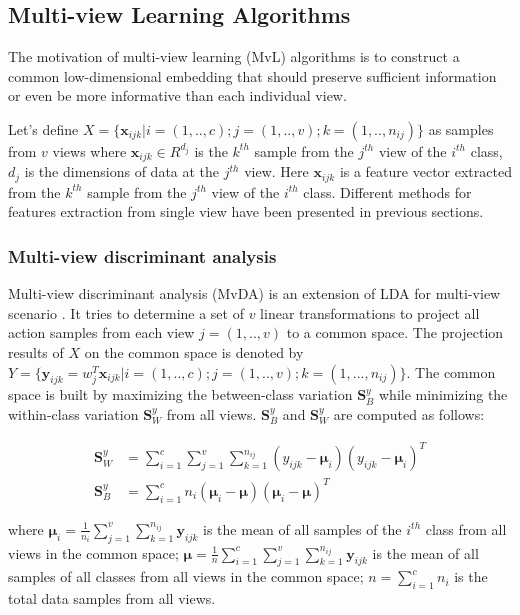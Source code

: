 
\subsection{Multi-view Learning Algorithms}

    The motivation of multi-view learning (MvL) algorithms is to construct a common low-dimensional embedding that should preserve sufficient information or even be more informative than each individual view.

    Let's define $X = \{\boldsymbol{x}_{ijk}|i=(1,..,c);j = (1,..,v);k=(1,..,n_{ij})\}$ as samples from $v$ views where $\boldsymbol{x}_{ijk} \in R^{d_j}$ is the $k^{th}$ sample from the $j^{th}$ view of the $i^{th}$ class, $d_j$ is the dimensions of data at the $j^{th}$ view.
    Here ${\boldsymbol x}_{ijk}$ is a feature vector extracted from the $k^{th}$ sample from the $j^{th}$ view of the $i^{th}$ class.
    Different methods for features extraction from single view have been presented in previous sections. 

    \subsubsection{Multi-view discriminant analysis}
        Multi-view discriminant analysis (MvDA) is an extension of LDA for multi-view scenario \cite{kan2015multi}.
        It tries to determine a set of $v$ linear transformations to project all action samples from each view $j = (1,..,v)$ to a common space.
        The projection results of $X$ on the common space is denoted by $Y = \{\boldsymbol{y}_{ijk} = w_j^T\boldsymbol{x}_{ijk}|i=(1,..,c); j=(1,..,v); k=(1,...,n_{ij})\}$.
        The common space is built by maximizing the between-class variation $\boldsymbol{S}_B^y$ while minimizing the within-class variation $\boldsymbol{S}_W^y$ from all views. $\boldsymbol{S}_B^y$ and $\boldsymbol{S}_W^y$ are computed as follows: 

        \begin{align}
            \boldsymbol{S}_W^y &= \sum_{i=1}^{c}\sum_{j=1}^{v}\sum_{k=1}^{n_{ij}}(y_{ijk}-\boldsymbol{\mu}_i)(y_{ijk}-\boldsymbol{\mu}_i)^T \label{eq:MvDA_Sw}\\
            \boldsymbol{S}_B^y &= \sum_{i=1}^{c}n_i(\boldsymbol{\mu}_i - \boldsymbol{\mu})(\boldsymbol{\mu}_i - \boldsymbol{\mu})^T \label{eq:MvDA_Sb}
        \end{align}

        where $\boldsymbol{\mu}_i=\frac{1}{n_i}\sum_{j=1}^{v}{\sum_{k=1}^{n_{ij}}}{\boldsymbol{y}_{ijk}}$ is the mean of all samples of the $i^{th}$ class from all views in the common space; $\boldsymbol{\mu}=\frac{1}{n}\sum_{i=1}^{c}\sum_{j=1}^{v}{\sum_{k=1}^{n_{ij}}{\boldsymbol{y}_{ijk}}}$ is the mean of all samples of all classes from all views in the common space; $n=\sum_{i=1}^{c}n_i$ is the total data samples from all views.

